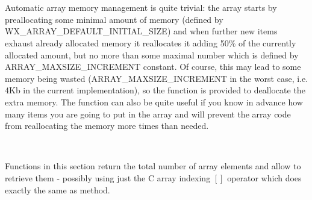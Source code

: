 \\
\\

\label{wxarraymemorymanagement}

Automatic array memory management is quite trivial: the array starts by
preallocating some minimal amount of memory (defined by
WX\_ARRAY\_DEFAULT\_INITIAL\_SIZE) and when further new items exhaust already
allocated memory it reallocates it adding 50\% of the currently allocated
amount, but no more than some maximal number which is defined by
ARRAY\_MAXSIZE\_INCREMENT constant. Of course, this may lead to some memory
being wasted (ARRAY\_MAXSIZE\_INCREMENT in the worst case, i.e. 4Kb in the
current implementation), so the  function is
provided to deallocate the extra memory. The  
function can also be quite useful if you know in advance how many items you are
going to put in the array and will prevent the array code from reallocating the
memory more times than needed.

\\


Functions in this section return the total number of array elements and allow to
retrieve them - possibly using just the C array indexing $[]$ operator which
does exactly the same as  method.

\\
\\
\\
\\


\\
\\
\\


